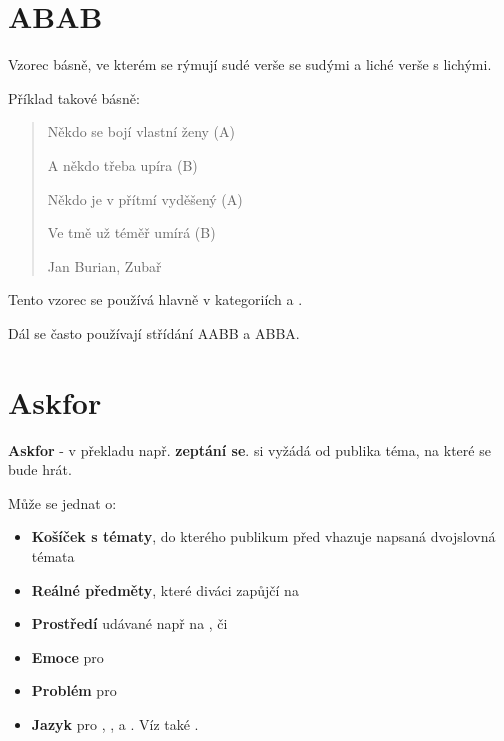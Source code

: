 \needspace{5cm} \section{ABAB} \label{abab} Vzorec básně, ve kterém se rýmují sudé verše se sudými a liché verše s lichými. 
 
Příklad takové básně: 
	 
\begin{quote} 
Někdo se bojí vlastní ženy (A)

 
A někdo třeba upíra (B)

 
Někdo je v přítmí vyděšený (A)

 
Ve tmě už téměř umírá (B) 
 
Jan Burian, Zubař 
\end{quote} 
 
Tento vzorec se používá hlavně v kategoriích  a . 
 
Dál se často používají střídání AABB a ABBA. 
 
 
 
\needspace{5cm} \section{Askfor} \label{askfor} \textbf{Askfor}{} - v překladu např. \textbf{zeptání se}{}.  si vyžádá od publika téma, na které se bude hrát. 
 
Může se jednat o: 
\begin{itemize}
\item \textbf{Košíček s tématy}{}, do kterého publikum před  vhazuje napsaná dvojslovná témata
\item \textbf{Reálné předměty}{}, které diváci zapůjčí na 
\item \textbf{Prostředí}{} udávané např na ,  či 
\item \textbf{Emoce}{} pro 
\item \textbf{Problém}{} pro 
\item \textbf{Jazyk}{} pro , ,  a . Víz také .
\end{itemize}
 
